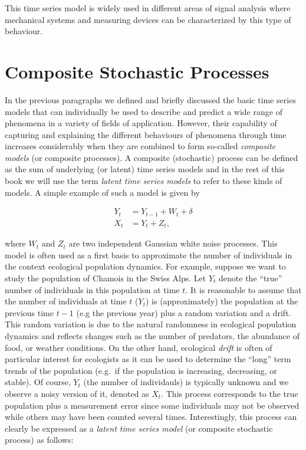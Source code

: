 \documentclass[]{book}
\theoremstyle{definition}
\theoremstyle{definition}
\theoremstyle{definition}
\theoremstyle{remark}
\begin{document}
This time series model is widely used in different areas of signal
analysis where mechanical systems and measuring devices can be
characterized by this type of behaviour.

\section{Composite Stochastic Processes}\label{lts}

In the previous paragraphs we defined and briefly discussed the basic
time series models that can individually be used to describe and predict
a wide range of phenomena in a variety of fields of application.
However, their capability of capturing and explaining the different
behaviours of phenomena through time increases considerably when they
are combined to form so-called \emph{composite models} (or composite
processes). A composite (stochastic) process can be defined as the sum
of underlying (or latent) time series models and in the rest of this
book we will use the term \emph{latent time series models} to refer to
these kinds of models. A simple example of such a model is given by

\[\begin{aligned}
Y_t &= Y_{t-1} + W_t + \delta\\
X_t &= Y_t + Z_t,
\end{aligned}\]

where \(W_t\) and \(Z_t\) are two independent Gaussian white noise
processes. This model is often used as a first basis to approximate the
number of individuals in the context ecological population dynamics. For
example, suppose we want to study the population of Chamois in the Swiss
Alps. Let \(Y_t\) denote the ``true'' number of individuals in this
population at time \(t\). It is reasonable to assume that the number of
individuals at time \(t\) (\(Y_t\)) is (approximately) the population at
the previous time \(t-1\) (e.g the previous year) plus a random
variation and a drift. This random variation is due to the natural
randomness in ecological population dynamics and reflects changes such
as the number of predators, the abundance of food, or weather
conditions. On the other hand, ecological \emph{drift} is often of
particular interest for ecologists as it can be used to determine the
``long'' term trends of the population (e.g.~if the population is
increasing, decreasing, or stable). Of course, \(Y_t\) (the number of
individauls) is typically unknown and we observe a noisy version of it,
denoted as \(X_t\). This process corresponds to the true population plus
a measurement error since some individuals may not be observed while
others may have been counted several times. Interestingly, this process
can clearly be expressed as a \emph{latent time series model} (or
composite stochastic process) as follows:
\end{document}
